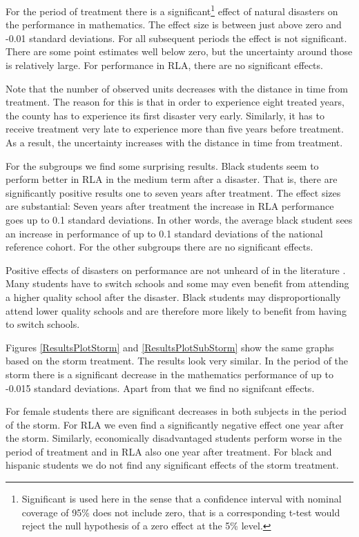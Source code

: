 For the period of treatment there is a significant\footnote{Significant is used here in the sense that a confidence interval with nominal coverage of 95\% does not include zero, that is a corresponding t-test would reject the null hypothesis of a zero effect at the 5\% level.} effect of natural disasters on the performance in mathematics. The effect size is between just above zero and -0.01 standard deviations. For all subsequent periods the effect is not significant. There are some point estimates well below zero, but the uncertainty around those is relatively large. For performance in RLA, there are no significant effects.

Note that the number of observed units decreases with the distance in time from treatment. The reason for this is that in order to experience eight treated years, the county has to experience its first disaster very early. Similarly, it has to receive treatment very late to experience more than five years before treatment. As a result, the uncertainty increases with the distance in time from treatment.

For the subgroups we find some surprising results. Black students seem to perform better in RLA in the medium term after a disaster. That is, there are significantly positive results one to seven years after treatment. The effect sizes are substantial: Seven years after treatment the increase in RLA performance goes up to 0.1 standard deviations. In other words, the average black student sees an increase in performance of up to 0.1 standard deviations of the national reference cohort. For the other subgroups there are no significant effects.

Positive effects of disasters on performance are not unheard of in the literature \citep[see e.g.][]{Sacerdote_2012}. Many students have to switch schools and some may even benefit from attending a higher quality school after the disaster. Black students may disproportionally attend lower quality schools and are therefore more likely to benefit from having to switch schools. 

Figures \ref{ResultsPlotStorm} and \ref{ResultsPlotSubStorm} show the same graphs based on the storm treatment. The results look very similar. In the period of the storm there is a significant decrease in the mathematics performance of up to -0.015 standard deviations. Apart from that we find no signifcant effects.

For female students there are significant decreases in both subjects in the period of the storm. For RLA we even find a significantly negative effect one year after the storm. Similarly, economically disadvantaged students perform worse in the period of treatment and in RLA also one year after treatment. For black and hispanic students we do not find any significant effects of the storm treatment.


